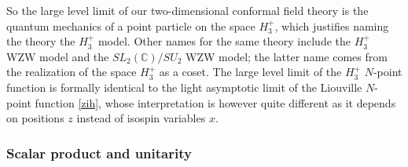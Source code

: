 \documentclass[12pt, a4paper, notitlepage, twoside]{report}
\numberwithin{equation}{section}
\theoremstyle{break}
\begin{document}
So the large level limit of our two-dimensional conformal field theory is the quantum mechanics of a point particle on the space $H_3^+$, which justifies naming the theory the $H_3^+$ model.
Other names for the same theory include the $H_3^+$ WZW model and the $SL_2({\mathbb{C}})/SU_2$ WZW model; the latter name comes from the realization of the space $H_3^+$ as a coset.
The large level limit of the $H_3^+$ $N$-point function is formally identical to the light asymptotic limit of the Liouville $N$-point function \eqref{zih}, whose interpretation is however quite different as it depends on positions $z$ instead of isospin variables $x$.


\subsubsection{Scalar product and unitarity}
\end{document}
